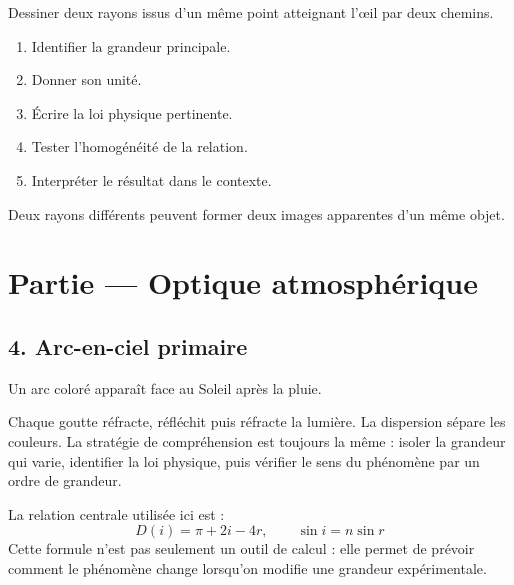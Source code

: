 \documentclass[11pt,a4paper]{article}
\begin{document}
\begin{exercicebox}
Dessiner deux rayons issus d'un même point atteignant l'œil par deux chemins.
\begin{enumerate}
  \item Identifier la grandeur principale.
  \item Donner son unité.
  \item Écrire la loi physique pertinente.
  \item Tester l'homogénéité de la relation.
  \item Interpréter le résultat dans le contexte.
\end{enumerate}
\end{exercicebox}

\begin{corrigebox}[Indication]
Deux rayons différents peuvent former deux images apparentes d'un même objet.
\end{corrigebox}


\section{Partie — Optique atmosphérique}


\subsection{4. Arc-en-ciel primaire}

\begin{exemplebox}
Un arc coloré apparaît face au Soleil après la pluie.
\end{exemplebox}

\begin{methodebox}
Chaque goutte réfracte, réfléchit puis réfracte la lumière. La dispersion sépare les couleurs.
La stratégie de compréhension est toujours la même : isoler la grandeur qui varie, identifier la loi physique, puis vérifier le sens du phénomène par un ordre de grandeur.
\end{methodebox}

\begin{theorembox}
La relation centrale utilisée ici est :
\[
D(i)=\pi+2i-4r,\qquad \sin i=n\sin r
\]
Cette formule n'est pas seulement un outil de calcul : elle permet de prévoir comment le phénomène change lorsqu'on modifie une grandeur expérimentale.
\end{theorembox}
\end{document}
